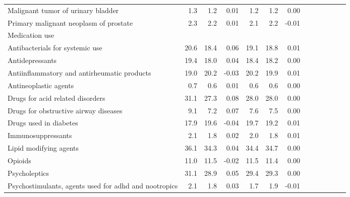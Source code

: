 \documentclass[11pt,]{article}
\begin{document}
\begin{longtable}{lrrrrrrrrrrrr}
      Malignant tumor of urinary bladder &  1.3 &   1.2 &  0.01 &  1.2 &   1.2 &  0.00 \\ 
      Primary malignant neoplasm of prostate &  2.3 &   2.2 &  0.01 &  2.1 &   2.2 & -0.01 \\ 
  Medication use &    &     &     &    &     &     \\ 
      Antibacterials for systemic use & 20.6 &  18.4 &  0.06 & 19.1 &  18.8 &  0.01 \\ 
      Antidepressants & 19.4 &  18.0 &  0.04 & 18.4 &  18.2 &  0.00 \\ 
      Antiinflammatory and antirheumatic products & 19.0 &  20.2 & -0.03 & 20.2 &  19.9 &  0.01 \\ 
      Antineoplastic agents &  0.7 &   0.6 &  0.01 &  0.6 &   0.6 &  0.00 \\ 
      Drugs for acid related disorders & 31.1 &  27.3 &  0.08 & 28.0 &  28.0 &  0.00 \\ 
      Drugs for obstructive airway diseases &  9.1 &   7.2 &  0.07 &  7.6 &   7.5 &  0.00 \\ 
      Drugs used in diabetes & 17.9 &  19.6 & -0.04 & 19.7 &  19.2 &  0.01 \\ 
      Immunosuppressants &  2.1 &   1.8 &  0.02 &  2.0 &   1.8 &  0.01 \\ 
      Lipid modifying agents & 36.1 &  34.3 &  0.04 & 34.4 &  34.7 &  0.00 \\ 
      Opioids & 11.0 &  11.5 & -0.02 & 11.5 &  11.4 &  0.00 \\ 
      Psycholeptics & 31.1 &  28.9 &  0.05 & 29.4 &  29.3 &  0.00 \\ 
      Psychostimulants, agents used for adhd and nootropics &  2.1 &   1.8 &  0.03 &  1.7 &   1.9 & -0.01 \\ 
   \bottomrule\end{longtable}
\clearpage
{}
\end{document}

